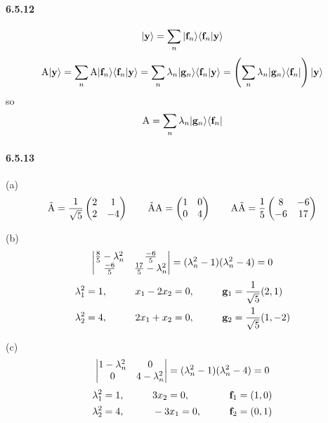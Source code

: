 \documentclass[a4paper]{article}
\begin{document}
\paragraph{6.5.12}
\[
|\mathbf{y}\rangle=\sum_n|\mathbf{f}_n\rangle\langle\mathbf{f}_n|\mathbf{y}\rangle
\]
\[
\mathrm{A}|\mathbf{y}\rangle=\sum_n\mathrm{A}|\mathbf{f}_n\rangle\langle\mathbf{f}_n|\mathbf{y}\rangle=\sum_n\lambda_n|\mathbf{g}_n\rangle\langle\mathbf{f}_n|\mathbf{y}\rangle=\left(\sum_n\lambda_n|\mathbf{g}_n\rangle\langle\mathbf{f}_n| \right)|\mathbf{y}\rangle
\]
so
\[
\mathrm{A}=\sum_n\lambda_n|\mathbf{g}_n\rangle\langle\mathbf{f}_n|
\]

\paragraph{6.5.13}
(a) 
\[
\tilde{\mathrm{A}}=\frac{1}{\sqrt{5}}
\begin{pmatrix}
2&1\\2&-4
\end{pmatrix}\qquad
\tilde{\mathrm{A}}\mathrm{A}=
\begin{pmatrix}
1&0\\0&4
\end{pmatrix}\qquad
\mathrm{A}\tilde{\mathrm{A}}=\frac{1}{5}
\begin{pmatrix}
8&-6\\-6&17
\end{pmatrix}
\]

(b) 
\renewcommand{\arraystretch}{1.5}
\[
\begin{vmatrix}
 \frac{8}{5}-\lambda_n^2&\frac{-6}{5} \\
 \frac{-6}{5} & \frac{17}{5}-\lambda_n^2 
\end{vmatrix}=
(\lambda_n^2-1)(\lambda_n^2-4)=0
\]
\begin{alignat*}{3}
    & \lambda_1^2=1 ,\qquad && x_1-2x_2=0,\qquad && \mathbf{g}_1=\frac{1}{\sqrt{5}}(2,1) \\
    & \lambda_2^2=4 ,\qquad && 2x_1+x_2=0,\qquad && \mathbf{g}_2=\frac{1}{\sqrt{5}}(1,-2)\\
\end{alignat*}

(c)
\[
\begin{vmatrix}
 1-\lambda_n^2&0 \\
0& 4-\lambda_n^2 
\end{vmatrix}=
(\lambda_n^2-1)(\lambda_n^2-4)=0
\]
\begin{alignat*}{3}
    & \lambda_1^2=1 ,\qquad && 3x_2=0,\qquad && \mathbf{f}_1=(1,0) \\
    & \lambda_2^2=4 ,\qquad && -3x_1=0,\qquad && \mathbf{f}_2=(0,1)\\
\end{alignat*}
\end{document}
